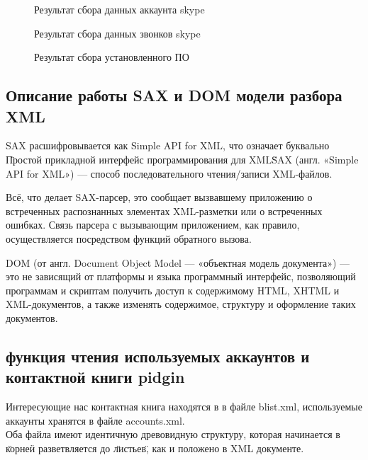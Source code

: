 \begin{figure}[h]
\caption{Результат сбора данных аккаунта skype}
\label{pic:xml_to_xslt5}
\end{figure}

\begin{figure}[h]
\caption{Результат сбора данных звонков skype}
\label{pic:xml_to_xslt6}
\end{figure}

\begin{figure}[h]
\caption{Результат сбора установленного ПО}
\label{pic:xml_to_xslt7}
\end{figure}

\subsection{Описание работы SAX и DOM модели разбора XML}

SAX расшифровывается как Simple API for XML, что означает буквально \"Простой прикладной интерфейс программирования для XML\"

SAX (англ. «Simple API for XML») — способ последовательного чтения/записи XML-файлов.

Всё, что делает SAX-парсер, это сообщает вызвавшему приложению о встреченных распознанных элементах XML-разметки или о встреченных ошибках. Связь парсера с вызывающим приложением, как правило, осуществляется посредством функций обратного вызова.

DOM (от англ. Document Object Model — «объектная модель документа») — это не зависящий от платформы и языка программный интерфейс, позволяющий программам и скриптам получить доступ к содержимому HTML, XHTML и XML-документов, а также изменять содержимое, структуру и оформление таких документов.\cite{valikov}

\subsection{функция чтения используемых аккаунтов и контактной книги pidgin}

Интересующие нас контактная книга находятся в %
в файле blist.xml, используемые аккаунты хранятся в файле accounts.xml.
\\Оба файла имеют идентичную древовидную структуру, которая начинается в \"корне\" и разветвляется до \"листьев\", как и положено в XML документе.

